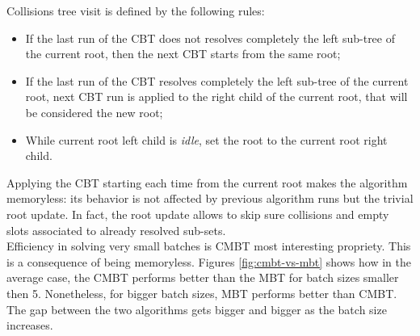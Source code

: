 \documentclass[11pt,a4paper,twoside,openright]{book}
\begin{document}
\noindent Collisions tree visit is defined by the following rules: 
\begin{itemize}
\item If the last  run of the CBT does not resolves completely the left sub-tree of the current root, then the next CBT starts from the same root;
\item If the last run of the CBT resolves completely the left sub-tree of the current root, next CBT run is applied to the right child of the current root, that will be considered the new root;
\item While current root left child is \emph{idle}, set the root to the current root right child.
\end{itemize}
Applying the CBT starting each time from the current root makes the algorithm memoryless: its behavior is not affected by previous algorithm runs but the trivial root update. In fact, the root update allows to skip sure collisions and empty slots associated to already resolved sub-sets.\\ 

Efficiency in solving very small batches is CMBT most interesting propriety. This is a consequence of being memoryless. 
Figures \ref{fig:cmbt-vs-mbt} shows how in the average case, the CMBT performs better than the MBT  for batch sizes smaller then 5. Nonetheless, for bigger batch sizes, MBT performs better than CMBT. The gap between the two algorithms gets bigger and bigger as the batch size increases.\\
\end{document}
